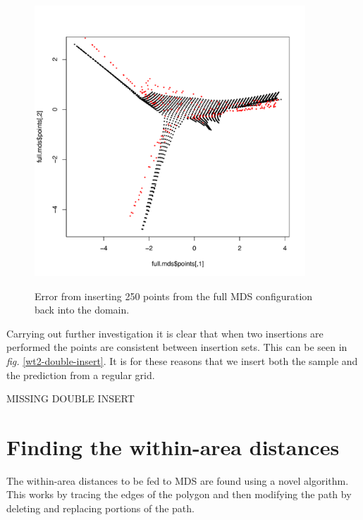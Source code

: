 \documentclass[a4paper,10pt]{article}
\newcommand{\fig}[1]{\emph{fig.} \ref{#1}}
\begin{document}
\begin{figure}
\centering
\includegraphics[width=4in]{figs/wt2-gowererr-fullover.pdf} \\
\caption{Error from inserting 250 points from the full MDS configuration back into the domain.}
\label{gowerfullinsert}
\end{figure}

Carrying out further investigation it is clear that when two insertions are performed the points are consistent between insertion sets. This can be seen in \fig{wt2-double-insert}. It is for these reasons that we insert both the sample and the prediction from a regular grid.

MISSING DOUBLE INSERT



\section{Finding the within-area distances}

The within-area distances to be fed to MDS are found using a novel algorithm. This works by tracing the edges of the polygon and then modifying the path by deleting and replacing portions of the path. 
\end{document}
